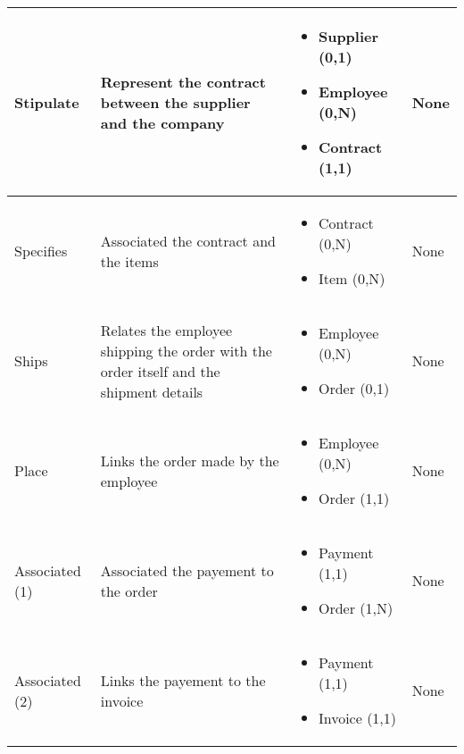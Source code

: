 \begin{longtable}{|p{}|p{} |p{}|p{} |}
Stipulate & Represent the contract between the supplier and the company  & \begin{itemize}
	\vspace{-1em}
	\item Supplier (0,1) 
	\item Employee (0,N)
    \item Contract  (1,1)
	\end{itemize}
&  None\\\hline

Specifies & Associated the contract and the items  & \begin{itemize}
	\vspace{-1em}
	\item Contract (0,N)
	\item Item (0,N)
	\end{itemize}
&  None\\\hline


Ships & Relates the employee shipping the order with the order itself and the shipment details & \begin{itemize}
	\vspace{-1em}
	\item Employee (0,N)
	\item Order (0,1)
\end{itemize}
&  None \\\hline

Place & Links the order made by the employee & \begin{itemize}
	\vspace{-1em}
	\item Employee (0,N)
	\item Order  (1,1)
\end{itemize}
&  None \\\hline

Associated (1) & Associated the payement to the order & \begin{itemize}
	\vspace{-1em}
	\item Payment (1,1)
	\item Order  (1,N)
\end{itemize}
&  None \\\hline

Associated (2) & Links the payement to the invoice & \begin{itemize}
	\vspace{-1em}
	\item Payment (1,1)
	\item Invoice  (1,1)
\end{itemize}
&  None \\\hline


\end{longtable}
